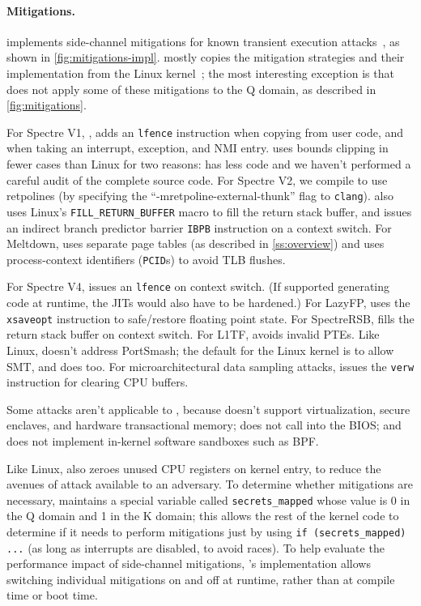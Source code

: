 \paragraph{Mitigations.}

\sys implements side-channel mitigations for known transient
execution attacks~\cite{hill:survey,sok:transient}, as shown
in \autoref{fig:mitigations-impl}.  \sys mostly copies the
mitigation strategies and their implementation from the Linux
kernel~\cite{linux:vuln}; the most interesting exception is that \sys
does not apply some of these mitigations to the Q domain, as described
in \autoref{fig:mitigations}.

For Spectre V1, \sys, adds an \texttt{lfence} instruction when copying
from user code, and when taking an interrupt, exception, and NMI entry.
\sys uses bounds clipping in fewer cases than Linux for two reasons:
\sys has less code and we haven't performed a careful audit of the
complete source code.  For Spectre V2, we compile \sys to use retpolines
(by specifying the ``-mretpoline-external-thunk'' flag to \texttt{clang}). \sys
also uses Linux's \texttt{FILL\_RETURN\_BUFFER} macro to fill the
return stack buffer, and issues an indirect branch predictor barrier
\texttt{IBPB} instruction on a context switch. For Meltdown, \sys uses
separate page tables (as described in \autoref{ss:overview}) and uses
process-context identifiers (\texttt{PCID}s) to avoid TLB flushes.

For Spectre V4, \sys issues an \texttt{lfence} on context switch. (If
\sys supported generating code at runtime, the JITs would also have to
be hardened.)  For LazyFP, \sys uses the \texttt{xsaveopt}
instruction to safe/restore floating point state.  For SpectreRSB,
\sys fills the return stack buffer on context switch.  For L1TF, \sys
avoids invalid PTEs. Like Linux, \sys doesn't address PortSmash; the
default for the Linux kernel is to allow SMT, and \sys does too.  For
microarchitectural data sampling attacks, \sys issues the
\texttt{verw} instruction for clearing CPU buffers.

Some attacks aren't applicable to \sys, because \sys doesn't support
virtualization, secure enclaves, and hardware transactional memory;
does not call into the BIOS; and does not implement in-kernel software
sandboxes such as BPF.

Like Linux, \sys also zeroes unused CPU registers on kernel entry, to
reduce the avenues of attack available to an adversary.  To determine
whether mitigations are necessary, \sys maintains a special variable
called \texttt{secrets\_mapped} whose value is 0 in the Q domain and 1 in
the K domain; this allows the rest of the kernel code to determine if it
needs to perform mitigations just by using \texttt{if (secrets\_mapped)
...} (as long as interrupts are disabled, to avoid races).  To help
evaluate the performance impact of side-channel mitigations, \sys's
implementation allows switching individual mitigations on and off at
runtime, rather than at compile time or boot time.

